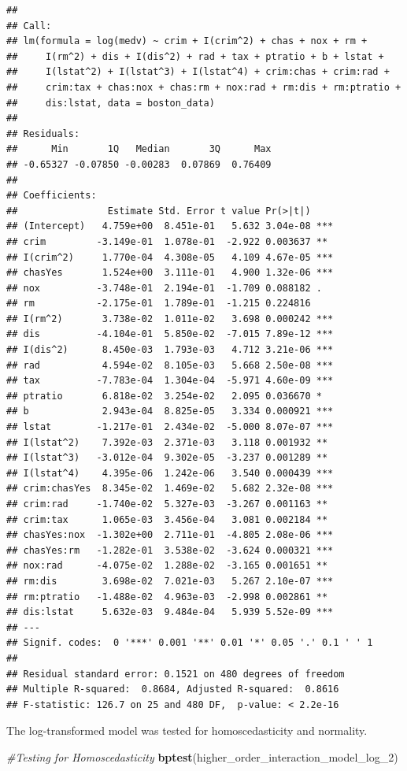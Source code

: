 \documentclass[
]{article}
\newenvironment{Shaded}{\begin{snugshade}}{\end{snugshade}}
\newcommand{\CommentTok}[1]{\textcolor[rgb]{0.56,0.35,0.01}{\textit{#1}}}
\newcommand{\FunctionTok}[1]{\textcolor[rgb]{0.13,0.29,0.53}{\textbf{#1}}}
\newcommand{\NormalTok}[1]{#1}
\begin{document}
\begin{verbatim}
## 
## Call:
## lm(formula = log(medv) ~ crim + I(crim^2) + chas + nox + rm + 
##     I(rm^2) + dis + I(dis^2) + rad + tax + ptratio + b + lstat + 
##     I(lstat^2) + I(lstat^3) + I(lstat^4) + crim:chas + crim:rad + 
##     crim:tax + chas:nox + chas:rm + nox:rad + rm:dis + rm:ptratio + 
##     dis:lstat, data = boston_data)
## 
## Residuals:
##      Min       1Q   Median       3Q      Max 
## -0.65327 -0.07850 -0.00283  0.07869  0.76409 
## 
## Coefficients:
##                Estimate Std. Error t value Pr(>|t|)    
## (Intercept)   4.759e+00  8.451e-01   5.632 3.04e-08 ***
## crim         -3.149e-01  1.078e-01  -2.922 0.003637 ** 
## I(crim^2)     1.770e-04  4.308e-05   4.109 4.67e-05 ***
## chasYes       1.524e+00  3.111e-01   4.900 1.32e-06 ***
## nox          -3.748e-01  2.194e-01  -1.709 0.088182 .  
## rm           -2.175e-01  1.789e-01  -1.215 0.224816    
## I(rm^2)       3.738e-02  1.011e-02   3.698 0.000242 ***
## dis          -4.104e-01  5.850e-02  -7.015 7.89e-12 ***
## I(dis^2)      8.450e-03  1.793e-03   4.712 3.21e-06 ***
## rad           4.594e-02  8.105e-03   5.668 2.50e-08 ***
## tax          -7.783e-04  1.304e-04  -5.971 4.60e-09 ***
## ptratio       6.818e-02  3.254e-02   2.095 0.036670 *  
## b             2.943e-04  8.825e-05   3.334 0.000921 ***
## lstat        -1.217e-01  2.434e-02  -5.000 8.07e-07 ***
## I(lstat^2)    7.392e-03  2.371e-03   3.118 0.001932 ** 
## I(lstat^3)   -3.012e-04  9.302e-05  -3.237 0.001289 ** 
## I(lstat^4)    4.395e-06  1.242e-06   3.540 0.000439 ***
## crim:chasYes  8.345e-02  1.469e-02   5.682 2.32e-08 ***
## crim:rad     -1.740e-02  5.327e-03  -3.267 0.001163 ** 
## crim:tax      1.065e-03  3.456e-04   3.081 0.002184 ** 
## chasYes:nox  -1.302e+00  2.711e-01  -4.805 2.08e-06 ***
## chasYes:rm   -1.282e-01  3.538e-02  -3.624 0.000321 ***
## nox:rad      -4.075e-02  1.288e-02  -3.165 0.001651 ** 
## rm:dis        3.698e-02  7.021e-03   5.267 2.10e-07 ***
## rm:ptratio   -1.488e-02  4.963e-03  -2.998 0.002861 ** 
## dis:lstat     5.632e-03  9.484e-04   5.939 5.52e-09 ***
## ---
## Signif. codes:  0 '***' 0.001 '**' 0.01 '*' 0.05 '.' 0.1 ' ' 1
## 
## Residual standard error: 0.1521 on 480 degrees of freedom
## Multiple R-squared:  0.8684, Adjusted R-squared:  0.8616 
## F-statistic: 126.7 on 25 and 480 DF,  p-value: < 2.2e-16
\end{verbatim}

The log-transformed model was tested for homoscedasticity and normality.

\begin{Shaded}
\begin{Highlighting}[]
\CommentTok{\#Testing for Homoscedasticity}
\FunctionTok{bptest}\NormalTok{(higher\_order\_interaction\_model\_log\_2)}
\end{Highlighting}
\end{Shaded}
\end{document}
